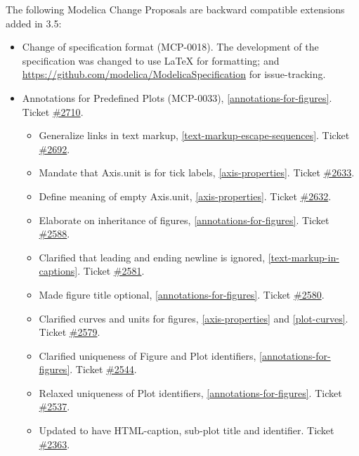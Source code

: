 The following Modelica Change Proposals are backward compatible extensions added in 3.5:
\begin{itemize}
\item Change of specification format (MCP-0018).
The development of the specification was changed to use \LaTeX{} for formatting; and \url{https://github.com/modelica/ModelicaSpecification} for issue-tracking.
\item Annotations for Predefined Plots (MCP-0033), \cref{annotations-for-figures}. Ticket \href{https://github.com/modelica/ModelicaSpecification/pull/2710}{\#2710}.
\begin{itemize}
\item Generalize links in text markup, \cref{text-markup-escape-sequences}.
Ticket \href{https://github.com/modelica/ModelicaSpecification/pull/2692}{\#2692}.
\item Mandate that Axis.unit is for tick labels, \cref{axis-properties}.
Ticket \href{https://github.com/modelica/ModelicaSpecification/pull/2633}{\#2633}.
\item Define meaning of empty Axis.unit, \cref{axis-properties}.
Ticket \href{https://github.com/modelica/ModelicaSpecification/pull/2632}{\#2632}.
\item Elaborate on inheritance of figures, \cref{annotations-for-figures}.
Ticket \href{https://github.com/modelica/ModelicaSpecification/pull/2588}{\#2588}.
\item Clarified that leading and ending newline is ignored, \cref{text-markup-in-captions}.
Ticket \href{https://github.com/modelica/ModelicaSpecification/pull/2581}{\#2581}.
\item Made figure title optional, \cref{annotations-for-figures}.
Ticket \href{https://github.com/modelica/ModelicaSpecification/pull/2580}{\#2580}.
\item Clarified curves and units for figures, \cref{axis-properties} and \cref{plot-curves}.
Ticket \href{https://github.com/modelica/ModelicaSpecification/pull/2579}{\#2579}.
\item Clarified uniqueness of Figure and Plot identifiers, \cref{annotations-for-figures}.
Ticket \href{https://github.com/modelica/ModelicaSpecification/pull/2544}{\#2544}.
\item Relaxed uniqueness of Plot identifiers, \cref{annotations-for-figures}.
Ticket \href{https://github.com/modelica/ModelicaSpecification/pull/2537}{\#2537}.
\item Updated to have HTML-caption, sub-plot title and identifier.
Ticket \href{https://github.com/modelica/ModelicaSpecification/issues/2363}{\#2363}.
\end{itemize}
\end{itemize}

